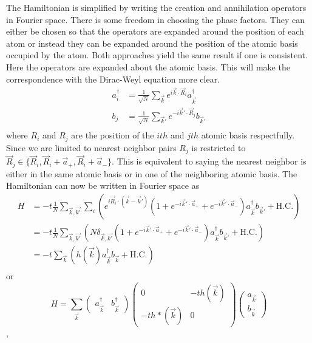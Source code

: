 The Hamiltonian is simplified by writing the creation and annihilation operators in Fourier space.
There is some freedom in choosing the phase factors.
They can either be chosen so that the operators are expanded around the position of each atom or instead they can be expanded around the position of the atomic basis occupied by the atom.
Both approaches yield the same result if one is consistent\cite{Bena2009}.
Here the operators are expanded about the atomic basis.
This will make the correspondence with the Dirac-Weyl equation more clear.
\begin{align*}
	a_i^{\dagger}&=\frac{1}{\sqrt{N}}\sum_{\vec{k} } e^{ i \vec{k}  \cdot \vec{R}_i} a_{\vec{k} }^{\dagger} \\
	b_j          &=\frac{1}{\sqrt{N}}\sum_{\vec{k}'} e^{-i \vec{k}' \cdot \vec{R}_j} b_{\vec{k}'} \\
\end{align*}
where $R_i$ and $R_j$ are the position of the $ith$ and $jth$ atomic basis respectfully.  
Since we are limited to nearest neighbor pairs $R_j$ is restricted to $\vec{R}_j \in \{ \vec{R}_i,\vec{R}_i+\vec{a}_+,\vec{R}_i+\vec{a}_-\}$.
This is equivalent to saying the nearest neighbor is either in the same atomic basis or in one of the neighboring atomic basis. 
The Hamiltonian can now be written in Fourier space as
\begin{align}
	H&=-t \frac{1}{N} \sum_{\vec{k},\vec{k'}}\sum_i \left( e^{i \vec{R}_i \cdot (\vec{k}-\vec{k}')}
		\left( 1+e^{-i \vec{k}' \cdot \vec{a}_+}+e^{-i \vec{k}' \cdot \vec{a}_-} \right) 
		a^{\dagger}_{\vec{k}} b_{\vec{k}'} + \text{H.C.} \right)\\
	 &=-t \frac{1}{N} \sum_{\vec{k},\vec{k'}}\left( N \delta_{\vec{k},\vec{k'}}
	 	\left( 1+e^{-i \vec{k}' \cdot \vec{a}_+}+e^{-i \vec{k}' \cdot \vec{a}_-}\right) 
		a^{\dagger}_{\vec{k}} b_{\vec{k}'} + \text{H.C.}\right)\\ 
	 &=-t \sum_{\vec{k}}\left( h(\vec{k})a^{\dagger}_{\vec{k}} b_{\vec{k}} + \text{H.C.} \right)\\ 
\end{align}
or
\begin{equation}
	H=\sum_{\vec k} 
		\left( \begin{array}{cc} a^{\dagger}_{\vec{k}} & b^{\dagger}_{\vec{k}} \end{array} \right)
		\left( \begin{array}{cc}
			0              & -t h(\vec{k}) \\
			-t h*(\vec{k}) & 0                                                 \end{array} \right)
		\left( \begin{array}{c } a_{\vec{k}}           \\ b_{\vec{k}}          \end{array} \right) 
	\label{eq:TB:RealSpace}
\end{equation},

